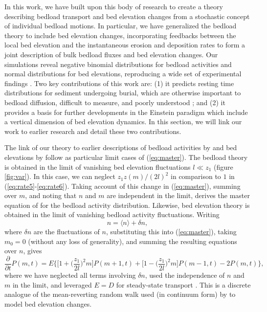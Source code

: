 \documentclass[draft]{agujournal2018}
\newcommand\be{\begin{equation}} %
\newcommand\ee{\end{equation}}   %
\newcommand\bra{\langle}
\newcommand\ket{\rangle}
\begin{document}
In this work, we have built upon this body of research to create a theory describing bedload transport and bed elevation changes from a stochastic concept of individual bedload motions.
In particular, we have generalized the \citet{Ancey2008} bedload theory to include bed elevation changes, incorporating feedbacks between the local bed elevation and the instantaneous erosion and deposition rates \citep[e.g.][]{Wong2007} to form a joint description of bulk bedload fluxes and bed elevation changes.
Our simulations reveal negative binomial distributions for bedload activities and normal distributions for bed elevations, reproducing a wide set of experimental findings \citep{Ancey2008, Heyman2016, Wong2007, Singh2009, Martin2014}.
Two key contributions of this work are: (1) it predicts resting time distributions for sediment undergoing burial, which are otherwise important to bedload diffusion, difficult to measure, and poorly understood \citep[e.g.][]{Voepel2013, Martin2014, Bradley2017}; and (2) it provides a basis for further developments in the Einstein paradigm which include a vertical dimension of bed elevation dynamics.
In this section, we will link our work to earlier research and detail these two contributions. 

The link of our theory to earlier descriptions of bedload activities by \citet{Ancey2008} and bed elevations by \citet{Martin2014} follow as particular limit cases of (\ref{eq:master}).
The \citet{Ancey2008} bedload theory is obtained in the limit of vanishing bed elevation fluctuations $l\ll z_1$ (figure \ref{fig:var}).
In this case, we can neglect $z_1 z(m)/(2l)^2$ in comparison to $1$ in (\ref{eq:rate5}-\ref{eq:rate6}).
Taking account of this change in (\ref{eq:master}), summing over $m$, and noting that $n$ and $m$ are independent in the limit, derives the master equation of \citet{Ancey2008} for the bedload activity distribution.
Likewise, \citet{Martin2014} bed elevation theory is obtained in the limit of vanishing bedload activity fluctuations.
Writing
\be n = \bra n \ket + \delta n \label{eq:mft}, \ee
where $\delta n$ are the fluctuations of $n$,  substituting this into (\ref{eq:master}), taking $m_0=0$ (without any loss of generality), and summing the resulting equations over $n$, gives
\be \frac{\partial}{\partial t}P(m,t) =  E \Big\{ \Big[1 +\Big(\frac{z_1}{2 l}\Big)^2m\Big]P(m+1,t) +  \Big[1 -\Big(\frac{z_1}{2 l}\Big)^2m\Big]P(m-1,t) - 2P(m,t)\Big\}, \label{eq:ou}\ee
where we have neglected all terms involving $\delta n$, used the independence of $n$ and $m$ in the limit, and leveraged $E=D$ for steady-state transport \citep[e.g.][]{Einstein1950}.
This is a discrete analogue of the mean-reverting random walk used (in continuum form) by \citet{Martin2014} to model bed elevation changes.
\end{document}
